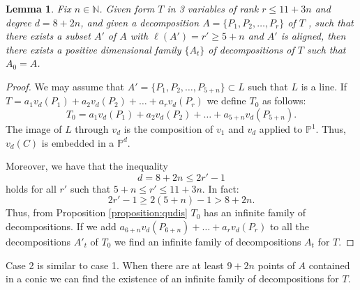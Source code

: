 \documentclass[a4paper,10pt,oneside]{article}
\theoremstyle{casep}
\newcommand{\Pj}{\mathbb{P}}
\newcommand{\N}{\mathbb{N}}
\newtheorem{lemma}[theorem]{Lemma}
\theoremstyle{definition}
\begin{document}
\begin{lemma}
	\label{lemma:2}
	Fix $ n \in \N $. Given form $T$ in 3 variables of rank $ r \leq 11+3n $ and degree $ d=8+2n$, and given a decomposition $A= \{ P_1,P_2, \dots , P_{r} \}$ of $T$ , such that there exists a subset $ A' $ of $ A $ with $ \ell(A')=r'\geq 5+n $ and $A'$ is aligned, then there exists a positive dimensional family $ \{ A_t \}$ of decompositions of $T$ such that $A_0=A$.
\end{lemma}
\begin{proof} We may assume that $ A' = \{ P_1, P_2, \dots ,P_{5+n}\} \subset L$ such that $ L $ is a line.
	If $ T= a_1 v_d(P_1)+a_2v_d(P_2)+\dots +a_r v_d(P_r) $ we define $ T_0 $ as follows: $$ T_0=a_1 v_d(P_1)+a_2v_d(P_2)+\dots +a_{5+n} v_d(P_{5+n}).$$
The image of $L$ through $v_d$ is the composition of $v_1$ and $v_d$ applied to $\Pj^1$. Thus, $v_d(C)$ is embedded in a $\Pj^ {d}$. 
	
	Moreover, we have that the inequality
	$$d=8+2n \leq 2r'-1$$ holds for all $r'$ such that $5+n \leq r' \leq 11+3n$. In fact:
	$$2r'-1 \geq 2(5+n)-1 > 8+2n.$$
	Thus, from Proposition \ref{proposition:qudis} $ T_0 $ has an infinite family of decompositions. If we add $ a_{6+n}v_d(P_{6+n})+\dots +a_{r} v_d(P_r) $ to all the decompositions $A'_t$ of $ T_0 $ we find an infinite family of decompositions $A_t$ for $T$.
	
	
\end{proof}

Case 2 is similar to case 1. When there are at least $ 9+2n $ points of $A$ contained in a conic we can find the existence of an infinite family of decompositions for $T$. 
\end{document}
